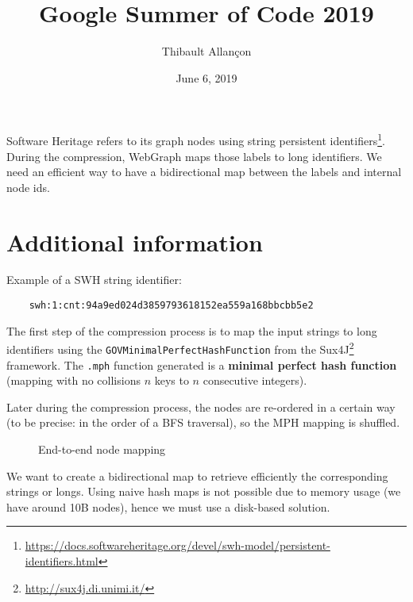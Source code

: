 \documentclass[11pt,a4paper]{article}
\title{Google Summer of Code 2019}
\author{Thibault Allançon}
\date{June 6, 2019}
\begin{document}
\maketitle

Software Heritage refers to its graph nodes using string persistent
identifiers\footnote{\url{https://docs.softwareheritage.org/devel/swh-model/persistent-identifiers.html}}.
During the compression, WebGraph maps those labels to long identifiers. We need
an efficient way to have a bidirectional map between the labels and internal
node ids.

\section{Additional information}

Example of a SWH string identifier:

\begin{verbatim}
    swh:1:cnt:94a9ed024d3859793618152ea559a168bbcbb5e2
\end{verbatim}

The first step of the compression process is to map the input strings to long
identifiers using the \texttt{GOVMinimalPerfectHashFunction} from the
Sux4J\footnote{\url{http://sux4j.di.unimi.it/}} framework. The
\texttt{.mph} function generated is a \textbf{minimal perfect hash
function} (mapping with no collisions $n$ keys to $n$ consecutive integers).

Later during the compression process, the nodes are re-ordered in a certain way
(to be precise: in the order of a BFS traversal), so the MPH mapping is
shuffled.

\begin{figure}[H]
    \centering
    \caption{End-to-end node mapping}
\end{figure}

We want to create a bidirectional map to retrieve efficiently the corresponding
strings or longs. Using naive hash maps is not possible due to memory usage (we
have around 10B nodes), hence we must use a disk-based solution.
\end{document}
